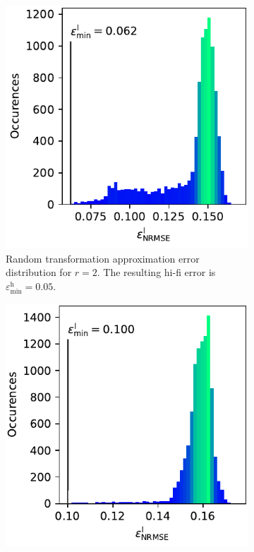 \documentclass[
  a4paper,  %
  twoside,  %
  bibliography=totoc,
  headsepline,
  cleardoublepage=empty,
  parskip=half,
  draft=false
]{scrbook}
\begin{document}
\newpage
\begin{mdframed}[style=style]
\vspace{2mm}
\begin{figure}[H]
  \centering
\begin{subfigure}{.5\textwidth}
  \centering
   \includegraphics[width=\linewidth]{graphics/ishigami_hist_2}
  \caption{Random transformation approximation error distribution for $r=2$. The resulting hi-fi error is $\varepsilon^\mathrm{h}_{\mathrm{min}}=0.05$.}
\vspace{3mm}
\label{fig:ishigami_hist_2}
\end{subfigure}%
\begin{subfigure}{.5\textwidth}
  \centering
   \includegraphics[width=\linewidth]{graphics/ishigami_hist_1}

\end{subfigure}
\end{figure}
\end{mdframed}
\end{document}
